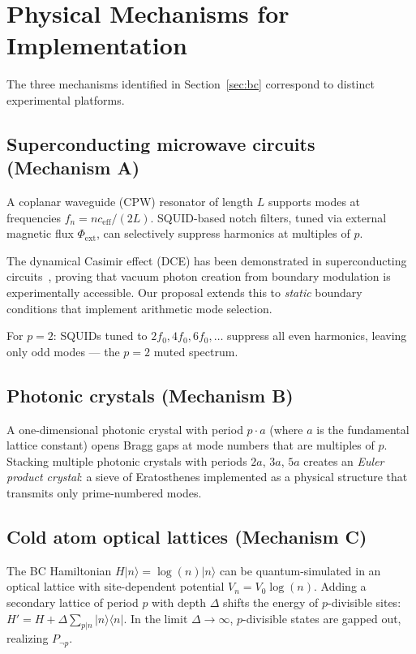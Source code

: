\documentclass[aps,prd,twocolumn,superscriptaddress,nofootinbib]{revtex4-2}
\begin{document}
\section{Physical Mechanisms for Implementation}
\label{sec:mechanisms}

The three mechanisms identified in Section~\ref{sec:bc} correspond
to distinct experimental platforms.

\subsection{Superconducting microwave circuits (Mechanism A)}

A coplanar waveguide (CPW) resonator of length $L$ supports
modes at frequencies $f_n = n c_{\mathrm{eff}} / (2L)$.
SQUID-based notch filters, tuned via external magnetic flux
$\Phi_{\mathrm{ext}}$, can selectively suppress
harmonics at multiples of $p$.

The dynamical Casimir effect (DCE) has been demonstrated
in superconducting circuits~\cite{Wilson2011}, proving that
vacuum photon creation from boundary modulation is
experimentally accessible. Our proposal extends this to
\emph{static} boundary conditions that implement arithmetic
mode selection.

For $p = 2$: SQUIDs tuned to $2f_0, 4f_0, 6f_0, \ldots$
suppress all even harmonics, leaving only odd modes ---
the $p = 2$ muted spectrum.

\subsection{Photonic crystals (Mechanism B)}

A one-dimensional photonic crystal with period $p \cdot a$
(where $a$ is the fundamental lattice constant) opens
Bragg gaps at mode numbers that are multiples of $p$.
Stacking multiple photonic crystals with periods
$2a$, $3a$, $5a$ creates an \emph{Euler product crystal}:
a sieve of Eratosthenes implemented as a physical structure
that transmits only prime-numbered modes.

\subsection{Cold atom optical lattices (Mechanism C)}

The BC Hamiltonian $H|n\rangle = \log(n)|n\rangle$ can be
quantum-simulated in an optical lattice with site-dependent
potential $V_n = V_0 \log(n)$.
Adding a secondary lattice of period $p$ with depth $\Delta$
shifts the energy of $p$-divisible sites:
$H' = H + \Delta \sum_{p|n} |n\rangle\langle n|$.
In the limit $\Delta \to \infty$, $p$-divisible states are
gapped out, realizing $P_{\neg p}$.
\end{document}
